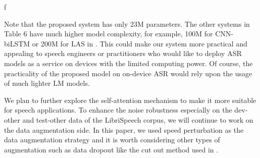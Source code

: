 f\documentclass{article}
\begin{document}
Note that the proposed system has only 23M parameters. The other systems in Table 6 have much higher model complexity, for example,  100M for CNN-biLSTM \cite{capio} or 200M for LAS in \cite{specaugment}. This could make our system more practical and appealing to speech engineers or practitioners who would like to deploy ASR models as a service on devices with the limited computing power. Of course, the practicality of the proposed model on on-device ASR would rely upon the usage of much lighter LM models. 

We plan to further explore the self-attention mechanism to make it more suitable for speech applications. To enhance the noise robustness especially on the dev-other and test-other data of the LibriSpeech corpus, we will continue to work on the data augmentation side. In this paper, we used speed perturbation as the data augmentation strategy and it is worth considering other types of augmentation such as data dropout like the cut out method used in \cite{specaugment}.










\end{document}
